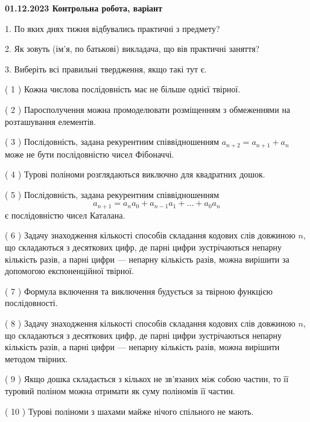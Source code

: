 \documentclass[12pt, ukrainian]{article}
\begin{document}
\vspace{4mm}
\newpage
\begin {large}

\textbf{01.12.2023 Контрольна робота, варіант  }\par


{
1. По яких днях тижня відбувались практичні з предмету?



\vspace{5mm}
2. Як зовуть (ім'я, по батькові) викладача, що вів практичні заняття?



\vspace{5mm}
3. Виберіть всі правильні твердження, якщо такі тут є.\par
\vspace{2mm}
( 1 ) Кожна числова послідовність має не більше однієї твірної.%

( 2 ) Паросполучення можна промоделювати розміщенням з обмеженнями на розташування елементів.%

( 3 ) Послідовність, задана рекурентним співвідношенням $a_{n+2}=a_{n+1}+a_{n}$ може не бути послідовністю чисел Фібоначчі.%

( 4 ) Турові поліноми розглядаються виключно для квадратних дошок.%

( 5 ) Послідовність, задана рекурентним співвідношенням $$a_{n+1}=a_{n}a_{0}+a_{n-1}a_{1}+\ldots+a_0a_{n}$$ є послідовністю чисел Каталана.%

( 6 ) Задачу знаходження кількості способів складання кодових слів довжиною $n$, що складаються з десяткових цифр, де парні цифри зустрічаються непарну кількість разів, а парні цифри — непарну кількість разів, можна вирішити за допомогою експоненційної твірної.%

( 7 ) Формула включення та виключення будується за твірною функцією послідовності.%

( 8 ) Задачу знаходження кількості способів складання кодових слів довжиною $n$, що складаються з десяткових цифр, де парні цифри зустрічаються непарну кількість разів, а парні цифри — непарну кількість разів, можна вирішити методом твірних.%

( 9 ) Якщо дошка складається з кількох не зв’язаних між собою частин, то її туровий поліном можна отримати як суму поліномів її частин.%

( 10 ) Турові поліноми з шахами майже нічого спільного не мають.%
}
\end {large}
\end{document}
